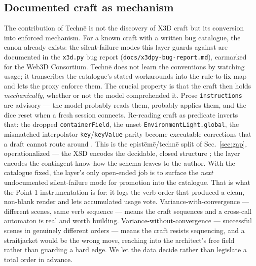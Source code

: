 \documentclass[sigconf,nonacm,screen,anonymous]{acmart}
\begin{document}
\subsection{Documented craft as mechanism}
The contribution of Technē is not the discovery of X3D craft but its conversion into enforced mechanism. For a known craft with a written bug catalogue, the canon already exists: the silent-failure modes this layer guards against are documented in the \texttt{x3d.py} bug report (\texttt{docs/x3dpy-bug-report.md}), earmarked for the Web3D Consortium. Technē does not learn the conventions by watching usage; it transcribes the catalogue's stated workarounds into the rule-to-fix map and lets the proxy enforce them. The crucial property is that the craft then holds \emph{mechanically}, whether or not the model comprehended it. Prose \texttt{instructions} are advisory --- the model probably reads them, probably applies them, and the dice reset when a fresh session connects. Re-reading craft as predicate inverts that: the dropped \texttt{containerField}, the unset \texttt{EnvironmentLight.global}, the mismatched interpolator \texttt{key}/\texttt{keyValue} parity become executable corrections that a draft cannot route around \cite{baml}. This is the epistēmē/technē split of Sec.~\ref{sec:gap}, operationalized --- the XSD encodes the decidable, closed structure \cite{x3d4,x3duom}; the layer encodes the contingent know-how the schema leaves to the author. With the catalogue fixed, the layer's only open-ended job is to surface the \emph{next} undocumented silent-failure mode for promotion into the catalogue. That is what the Point-1 instrumentation is for: it logs the verb order that produced a clean, non-blank render and lets accumulated usage vote. Variance-with-convergence --- different scenes, same verb sequence --- means the craft sequences and a cross-call automaton is real and worth building. Variance-without-convergence --- successful scenes in genuinely different orders --- means the craft resists sequencing, and a straitjacket would be the wrong move, reaching into the architect's free field rather than guarding a hard edge. We let the data decide rather than legislate a total order in advance.
\end{document}
